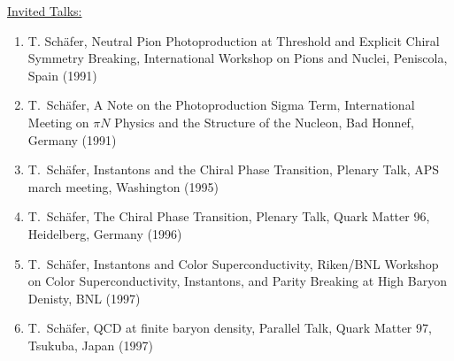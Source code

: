 \underline{Invited Talks:}
\begin{enumerate}

\item{ T. Sch\"afer, Neutral Pion Photoproduction at Threshold and
Explicit Chiral Symmetry Breaking, International Workshop on Pions 
and Nuclei, Peniscola, Spain (1991)}

\item{T.~Sch\"afer, A Note on the Photoproduction Sigma Term,
International Meeting on $\pi N$ Physics and the Structure of 
the Nucleon, Bad Honnef, Germany (1991)}

\item{T.~Sch\"afer, Instantons and the Chiral Phase Transition, 
Plenary Talk, APS march meeting, Washington (1995)}

\item{T.~Sch\"afer, The Chiral Phase Transition, Plenary Talk,
Quark Matter 96, Heidelberg, Germany (1996)}

\item{T.~Sch\"afer, Instantons and Color Superconductivity, 
Riken/BNL Workshop on Color Superconductivity, Instantons, 
and Parity Breaking at High Baryon Denisty, BNL (1997)}

\item{T.~Sch\"afer, QCD at finite baryon density, Parallel Talk,
Quark Matter 97, Tsukuba, Japan (1997)}

\end{enumerate}
